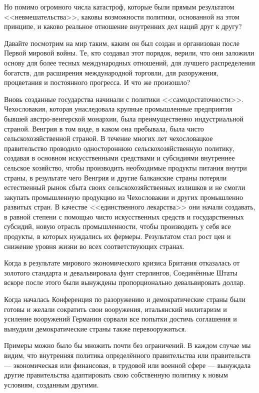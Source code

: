 Но помимо огромного числа катастроф, которые были прямым результатом <<невмешательства>>, каковы возможности политики, основанной на этом принципе, и каково реальное отношение внутренних дел наций друг к другу?
 
Давайте посмотрим на мир таким, каким он был создан и организован после Первой мировой войны. Те, кто создавал этот порядок, верили, что они заложили основу для более тесных международных отношений, для лучшего распределения богатств, для расширения международной торговли, для разоружения, процветания и постоянного прогресса. И что же произошло?

Вновь созданные государства начинали с политики <<самодостаточности>>. Чехословакия, которая унаследовала крупные промышленные предприятия бывшей австро-венгерской монархии, была преимущественно индустриальной страной. Венгрия в том виде, в каком она пребывала, была чисто сельскохозяйственной страной. В течение многих лет чехословацкое правительство проводило одностороннюю сельскохозяйственную политику, создавая в основном искусственными средствами и субсидиями внутреннее сельское хозяйство, чтобы производить необходимые продукты питания внутри страны, в результате чего Венгрия и другие балканские страны потеряли естественный рынок сбыта своих сельскохозяйственных излишков и не смогли закупать промышленную продукцию из Чехословакии и других промышленно развитых стран. В качестве <<единственного лекарства>> они начали создавать, в равной степени с помощью чисто искусственных средств и государственных субсидий, новую отрасль промышленности, чтобы производить у себя все продукты, в которых нуждались их фермеры. Результатом стал рост цен и снижение уровня жизни во всех соответствующих странах.
 
Когда в результате мирового экономического кризиса Британия отказалась от золотого стандарта и девальвировала фунт стерлингов, Соединённые Штаты вскоре после этого были вынуждены пропорционально девальвировать доллар.

Когда началась Конференция по разоружению и демократические страны были готовы и желали сократить свои вооружения, итальянский милитаризм и усиление вооружений Германии сорвали все попытки достичь соглашения и вынудили демократические страны также перевооружиться.
 
Примеры можно было бы множить почти без ограничений. В каждом случае мы видим, что внутренняя политика определённого правительства или правительств — экономическая или финансовая, в трудовой или военной сфере — вынуждала другие правительства адаптировать свою собственную политику к новым условиям, созданным другими.

